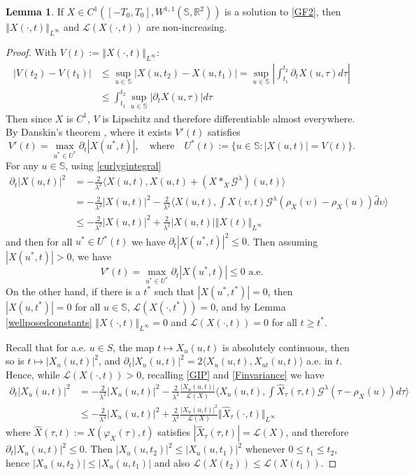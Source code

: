 \documentclass[a4paper,11pt]{amsart}
\theoremstyle{definition}\newtheorem*{definition}{Definition}
\theoremstyle{definition} \newtheorem{proposition}[theorem]{Proposition}
\theoremstyle{definition}\newtheorem{lemma}[theorem]{Lemma}
\theoremstyle{definition}\newtheorem{corollary}[theorem]{Corollary}
\theoremstyle{definition}\newtheorem{example}{Example}
\theoremstyle{remark}\newtheorem*{remark}{Remark}
\def\R{\mathbb{R}}
\def\S{\mathbb{S}}
\newcommand{\norm}[1]{{\left \Vert {#1}\right \Vert}}
\newcommand{\abs}[1]{\left | {#1}\right |}
\def\length{\mathcal L}
\begin{document}
\begin{lemma}\label{apriori}
If $X\in C^1([-T_0,T_0],W^{1,1}(\S,\R^2))$ is a solution to \eqref{GF2}, then $\norm{X(\cdot, t)}_{L^\infty}$ and $\length(X(\cdot,t))$ are non-increasing. 
\end{lemma}
\begin{proof} 
With $V(t):= \norm{X(\cdot,t)}_{L^\infty}$:
\begin{align*}
|V(t_2)-V(t_1)|&\leq \sup_{u\in \S}\left | X(u,t_2)-X(u,t_1)\right |=\sup_{u\in \S}\left | \int_{t_1}^{t_2} \partial_t X(u,\tau) d\tau \right | \\
&\leq \int_{t_1}^{t_2}\sup_{u\in \S}|\partial_t X(u,\tau)|d\tau 
\end{align*}
Then since $X$ is $C^1$, $V$ is Lipschitz and therefore differentiable almost everywhere. 
By Danskin's theorem \cite{danskin1966theory}, where it exists $V'(t)$ satisfies
\[ V'(t) = \max_{u^*\in U^*} \partial_t |X(u^*,t)|, \quad \text{where}\quad  U^*(t):=\{ u\in \S: |X(u,t)|=V(t)\}.
\]
For any $u\in \S$, using \eqref{curlygintegral}
\begin{align*}
\partial_t |X(u,t)|^2 & = - \frac{2}{\lambda^2} \langle X(u,t), X(u,t)+ (X\ast_X \mathcal G^\lambda)(u,t) \rangle \\
& = -\frac{2}{\lambda^2} |X(u,t)|^2-\frac{2}{\lambda^2}\Big \langle X(u,t),\int X(\upsilon,t)\mathcal G^\lambda(\rho_X(\upsilon)-\rho_X(u)) \hat d \upsilon \Big \rangle  \\
& \leq  -\frac{2}{\lambda^2} |X(u,t)|^2 +\frac{2}{\lambda^2}|X(u,t)|\norm{X(t)}_{L^\infty}
\end{align*}
and then for all $u^*\in U^*(t)$ we have $\partial_t |X(u^*,t)|^2\leq 0$.  Then assuming $|X(u^*,t)|>0$, we have
\[V'(t)=\max_{u^*\in U^*} \partial_t |X(u^*,t)| \leq 0 \,\, \text{a.e.} \]
On the other hand, if there is a $t^*$ such that $|X(u^*,t^*)|=0$, then $|X(u,t^*)|=0$ for all $u\in \S$, $\length(X(\cdot,t^*))=0$, and by Lemma \ref{wellposedconstants} $\norm{X(\cdot, t)}_{L^\infty}=0$ and $\length(X(\cdot,t))=0$ for all $t\geq t^*$.

Recall that for a.e. $u\in S$, the map $t\mapsto X_u(u,t)$ is absolutely continuous,  then so is $t\mapsto |X_u(u,t)|^2$, and $\partial_t|X_u(u,t)|^2=2\langle X_u(u,t),X_{ut}(u,t)\rangle $ a.e. in $t$. Hence, while $\length(X(\cdot,t))>0$, recalling \eqref{GIP} and \eqref{Finvariance} we have 
\begin{align*}
\partial_t |X_u(u,t)|^2
& = -\frac{2}{\lambda^2} |X_u(u,t)|^2 -\frac{2}{\lambda^2}\frac{\abs{X_u(u,t)}}{\length(X)}\Big \langle X_u(u,t),\int \hat X_\tau(\tau,t)\mathcal G^\lambda(\tau-\rho_X(u)) d \tau \Big \rangle\\
& \leq -\frac{2}{\lambda^2} |X_u(u,t)|^2+\frac{2}{\lambda^2}\frac{\abs{X_u(u,t)}^2}{\length(X)}{\Vert\hat X_\tau(\cdot, t)\Vert}_{L^\infty}
\end{align*}
where $\hat X(\tau,t):=X(\varphi_X(\tau),t)$ satisfies $|\hat X_\tau(\tau, t)|=\length(X)$, and therefore $\partial_t |X_u(u,t)|^2 \leq 0 $. Then $|X_u(u,t_2)|^2\leq |X_u(u,t_1)|^2$ whenever $0\leq t_1\leq t_2$, hence $|X_u(u,t_2)|\leq |X_u(u,t_1)|$ and also $\length(X(t_2))\leq \length(X(t_1))$.
\end{proof}
\end{document}
